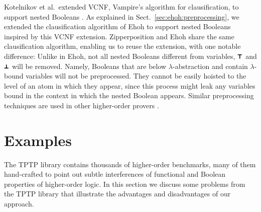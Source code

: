 Kotelnikov et al.\ extended VCNF, Vampire's algorithm for clausification, to support
nested Booleans \cite{kotelnikov-16-fool}. As explained in Sect.~\ref{sec:ehoh:preprocessing}, we extended
the clausification algorithm of Ehoh to support nested Booleans inspired by this VCNF extension.
Zipperposition and Ehoh share the
same clausification algorithm, enabling us to reuse the extension, with one
notable difference:
Unlike in Ehoh, not all nested Booleans different from variables, $\pmb{\top}$ and $\pmb{\bot}$
will be removed. Namely, Booleans that are below $\lambda$-abstraction
and contain $\lambda$-bound variables will not be preprocessed. They cannot be easily hoisted to the level of an atom in which
they appear, since this process might leak any variables bound in the context
in which the nested Boolean appears. Similar preprocessing techniques are used in other higher-order provers
\cite{wskb-16-effective-norm}.

\section{Examples}
\label{sect:bool:examples}

The TPTP library \cite{gs-17-tptp} contains thousands of higher-order benchmarks, many of them hand-crafted
to point out subtle interferences of functional and Boolean properties of higher-order logic. In this section
we discuss some problems from the TPTP library that illustrate the advantages and disadvantages
of our approach.

